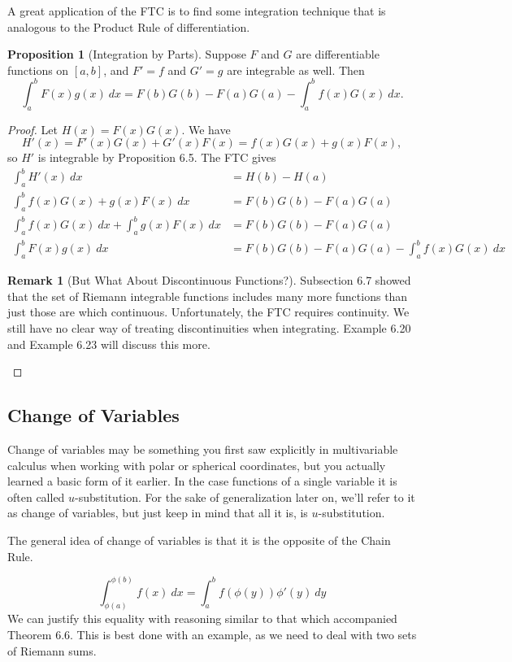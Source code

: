 \documentclass{article}
\theoremstyle{definition}
\newtheorem{proposition}{Proposition}[section]
\newtheorem{remark}{Remark}[section]
\begin{document}
A great application of the FTC is to find some integration technique that is analogous to the Product Rule of differentiation. 
\begin{proposition}[Integration by Parts]
Suppose $ F $ and $ G $ are differentiable functions on $ [a,b] $, and $ F'=f $ and $ G'=g $ are integrable as well. Then $$ \int_{a}^{b}F(x)g(x)\ dx=F(b)G(b)-F(a)G(a)-\int_{a}^{b}f(x)G(x)\ dx.$$
\end{proposition}
\begin{proof}
	Let $ H(x)=F(x)G(x) $. We have $$H'(x)=F'(x)G(x)+G'(x)F(x)=f(x)G(x)+g(x)F(x) ,$$ so $ H' $ is integrable by Proposition 6.5. The FTC gives \begin{align*}
		\int_{a}^{b}H'(x)\ dx&=H(b)-H(a)\\
		\int_{a}^{b}f(x)G(x)+g(x)F(x)\ dx&=F(b)G(b)-F(a)G(a)\\
		\int_{a}^{b}f(x)G(x)\ dx+\int_{a}^{b}g(x)F(x)\ dx&=F(b)G(b)-F(a)G(a)\\\int_{a}^{b}F(x)g(x)\ dx&=F(b)G(b)-F(a)G(a)-\int_{a}^{b}f(x)G(x)\ dx
	\end{align*}
	\begin{remark}[But What About Discontinuous Functions?]
		Subsection 6.7 showed that the set of Riemann integrable functions includes many more functions than just those are which continuous. Unfortunately, the FTC requires continuity. We still have no clear way of treating discontinuities when integrating. Example 6.20 and Example 6.23 will discuss this more.
	\end{remark}
\end{proof}
\subsection{Change of Variables}
Change of variables may be something you first saw explicitly in multivariable calculus when working with polar or spherical coordinates, but you actually learned a basic form of it earlier. In the case functions of a single variable it is often called $ u $-substitution. For the sake of generalization later on, we'll refer to it as change of variables, but just keep in mind that all it is, is $u$-substitution. 

The general idea of change of variables is that it is the opposite of the Chain Rule. 

$$ \int_{\phi(a)}^{\phi(b)}f(x)\ dx=\int_{a}^{b}f(\phi(y))\phi'(y)\ dy$$
We can justify this equality with reasoning similar to that which accompanied Theorem 6.6. This is best done with an example, as we need to deal with two sets of Riemann sums. 
\end{document}
